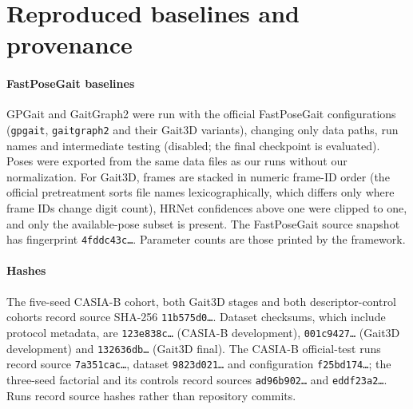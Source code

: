 \documentclass[11pt]{article}
\newcommand{\tablesetup}{\small\setlength{\tabcolsep}{4pt}}
\begin{document}
\begin{table}[!htbp]
\centering
\caption{Gait3D test, available-pose subset (947 probes, 5,122 gallery
sequences), evaluated once. Our rows give means over five seeds ($\pm$ seed
standard deviation for Rank-1 and mAP). ``Metric'' is the metric baseline and
``raw'' the raw-part descriptor. Parameters include the 2,892-way identity
classifier where present.}
\label{tab:s-gait3d-test}
{\tablesetup\footnotesize
}
\end{table}

\begin{table}[!htbp]
\centering
\caption{Raw part matching applied to GPGait, with paired differences. ``Full''
is the published descriptor and W its three whole-body embeddings; raw parts are
fused at $\lambda=0.5$ on GPGait's native distance. Intervals resample test
identities.}
\label{tab:s-gpgait-paired}
{\tablesetup\footnotesize
}
\end{table}

\section{Reproduced baselines and provenance}
\label{sec:s-provenance}

\paragraph{FastPoseGait baselines}
GPGait and GaitGraph2 were run with the official FastPoseGait configurations
(\texttt{gpgait}, \texttt{gaitgraph2} and their Gait3D variants), changing
only data paths, run names and intermediate testing (disabled; the final
checkpoint is evaluated). Poses were exported from the same data files as our
runs without our normalization. For Gait3D, frames are stacked in numeric
frame-ID order (the official pretreatment sorts file names lexicographically,
which differs only where frame IDs change digit count), HRNet confidences above
one were clipped to one, and only the available-pose subset is present. The
FastPoseGait source snapshot has fingerprint \texttt{4fddc43c\ldots}. Parameter
counts are those printed by the framework.

\paragraph{Hashes}
The five-seed CASIA-B cohort, both Gait3D stages and both descriptor-control
cohorts record source SHA-256 \texttt{11b575d0\ldots}. Dataset checksums,
which include protocol metadata, are \texttt{123e838c\ldots} (CASIA-B
development), \texttt{001c9427\ldots} (Gait3D development) and
\texttt{132636db\ldots} (Gait3D final). The CASIA-B official-test runs record
source \texttt{7a351cac\ldots}, dataset \texttt{9823d021\ldots} and
configuration \texttt{f25bd174\ldots}; the three-seed factorial and its
controls record sources \texttt{ad96b902\ldots} and \texttt{eddf23a2\ldots}.
Runs record source hashes rather than repository commits.
\end{document}

